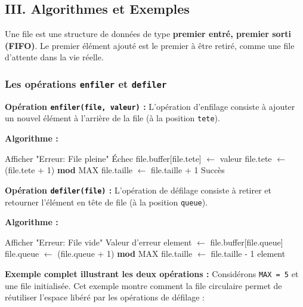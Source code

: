 \documentclass[a4paper, 11pt]{article}
\begin{document}
\subsection{III. Algorithmes et Exemples}

Une file est une structure de données de type \textbf{premier entré, premier sorti (FIFO)}. Le premier élément ajouté est le premier à être retiré, comme une file d'attente dans la vie réelle.

\subsubsection*{Les opérations \texttt{enfiler} et \texttt{defiler}}

\textbf{Opération \texttt{enfiler(file, valeur)} :}
L'opération d'enfilage consiste à ajouter un nouvel élément à l'arrière de la file (à la position \texttt{tete}).

\textbf{Algorithme :}
\begin{algorithmic}
    \State Afficher "Erreur: File pleine"
    \State \Return Échec
\Else
    \State file.buffer[file.tete] $\leftarrow$ valeur
    \State file.tete $\leftarrow$ (file.tete + 1) \textbf{ mod } MAX
    \State file.taille $\leftarrow$ file.taille + 1
    \State \Return Succès
\EndIf
\end{algorithmic}

\textbf{Opération \texttt{defiler(file)} :}
L'opération de défilage consiste à retirer et retourner l'élément en tête de file (à la position \texttt{queue}).

\textbf{Algorithme :}
\begin{algorithmic}
    \State Afficher "Erreur: File vide"
    \State \Return Valeur d'erreur
\Else
    \State element $\leftarrow$ file.buffer[file.queue]
    \State file.queue $\leftarrow$ (file.queue + 1) \textbf{ mod } MAX
    \State file.taille $\leftarrow$ file.taille - 1
    \State \Return element
\EndIf
\end{algorithmic}

\textbf{Exemple complet illustrant les deux opérations :}
Considérons \texttt{MAX = 5} et une file initialisée. Cet exemple montre comment la file circulaire permet de réutiliser l'espace libéré par les opérations de défilage :
\end{document}
